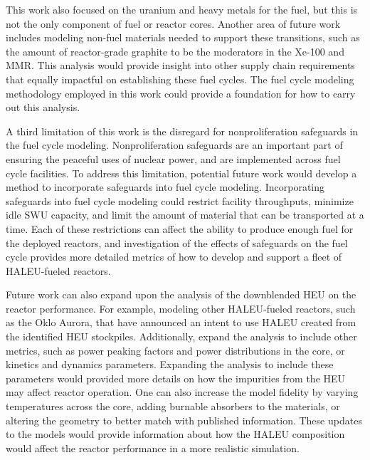 This work also focused on the uranium and heavy metals for 
the fuel, but this is not the only component of fuel or reactor 
cores. Another area of future work includes modeling non-fuel 
materials needed to support these transitions, such as the amount 
of reactor-grade graphite 
to be the moderators in the Xe-100 and \gls{MMR}. This analysis would 
provide insight into other supply chain requirements that equally 
impactful on establishing these fuel cycles. The fuel cycle modeling 
methodology employed in this work could provide a foundation 
for how to carry out this analysis. 

A third limitation of this work is the disregard for nonproliferation 
safeguards in the fuel cycle modeling. Nonproliferation safeguards 
are an important part of ensuring the peaceful uses of nuclear 
power, and are implemented across fuel cycle facilities. To 
address this limitation, potential future work would develop 
a method to incorporate safeguards into fuel cycle modeling. 
Incorporating safeguards into fuel cycle modeling could 
restrict facility throughputs, minimize idle \gls{SWU} 
capacity, and limit the amount of material that can be transported 
at a time. Each of these restrictions can affect the ability 
to produce enough fuel for the deployed reactors, and investigation 
of the effects of safeguards on the fuel cycle provides more 
detailed metrics of how to develop and support a fleet of 
\gls{HALEU}-fueled reactors. 

Future work can also expand upon the analysis of the downblended 
\gls{HEU} on the reactor performance. For example, modeling other 
\gls{HALEU}-fueled reactors, such as the Oklo Aurora, that 
have announced an intent to use \gls{HALEU} created from the identified 
\gls{HEU} stockpiles. Additionally, expand 
the analysis to include other metrics, such as power peaking factors and 
power distributions in the core, or kinetics and dynamics parameters. 
Expanding the analysis to include these parameters would provided 
more details on how the impurities from the \gls{HEU} may 
affect reactor operation. One can also increase the 
model fidelity by varying temperatures across the core, 
adding burnable absorbers to the materials, or altering the 
geometry to better match with published information. These 
updates to the models would provide information 
about how the \gls{HALEU} composition would affect the 
reactor performance in a more realistic simulation. 